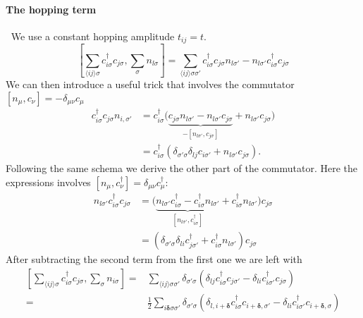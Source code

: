 \documentclass[../main.tex]{subfile}
\begin{document}
\paragraph{The hopping term} $~$ We use a constant hopping amplitude $t_{ij} = t$.
\[
    \left[ \sum_{\langle ij\rangle\sigma} c_{i\sigma}^{\dagger}c_{j\sigma} , \sum_{\sigma} n_{l\sigma}\right] 
    = \sum_{\langle ij\rangle\sigma\sigma'}  c_{i\sigma}^{\dagger}c_{j\sigma}n_{l\sigma'} - n_{l\sigma'}c_{i\sigma}^{\dagger}c_{j\sigma}
\]
We can then introduce a useful trick that involves the commutator $[n_{\mu},c_{\nu}] = -\delta_{\mu\nu}c_{\mu}$
\begin{equation*}
    \begin{aligned}
    c_{i\sigma}^{\dagger}c_{j\sigma}n_{i,\sigma'} &= c_{i\sigma}^{\dagger} \bigl( \underbrace{c_{j\sigma}n_{l\sigma'} 
    -n_{l\sigma'}c_{j\sigma}}_{-[n_{l\sigma'},c_{j\sigma}]} + n_{l\sigma'}c_{j\sigma}\bigr) \\
    & = c_{i\sigma}^{\dagger} \left(\delta_{\sigma'\sigma}\delta_{lj}c_{i\sigma'} + n_{l\sigma'}c_{j\sigma}\right).
    \end{aligned}
\end{equation*}
Following the same schema we derive the other part of the commutator. Here the expressions involves
$[n_{\mu}, c^{\dagger}_{\nu}] = \delta_{\mu\nu}c^{\dagger}_{\mu}$:
\begin{equation*}
    \begin{aligned}
        n_{l\sigma'}c_{i\sigma}^{\dagger}c_{j\sigma} &= \bigl( \underbrace{n_{l\sigma'}c_{i\sigma}^{\dagger} 
        - c_{i\sigma}^{\dagger}n_{l\sigma'}}_{[n_{l\sigma'}, c^{\dagger}_{i\sigma}]} + c_{i\sigma}^{\dagger}n_{l\sigma'} \bigr)c_{j\sigma} \\
        &= \left(\delta_{\sigma'\sigma}\delta_{li}c_{j\sigma'}^{\dagger} + c_{i\sigma}^{\dagger}n_{l\sigma'} \right)c_{j\sigma}
    \end{aligned}
\end{equation*}
After subtracting the second term from the first one we are left with
\begin{equation*}
    \begin{aligned}
    \left[ \sum_{\langle ij\rangle\sigma} c_{i\sigma}^{\dagger}c_{j\sigma} , \sum_{\sigma} n_{i\sigma}\right] 
    =&\sum_{\langle ij\rangle\sigma\sigma'} \delta_{\sigma'\sigma} \left( \delta_{lj}c_{i\sigma}^{\dagger} c_{j\sigma'} - \delta_{li}c_{i\sigma'}^{\dagger}c_{j\sigma}\right)\\
    =& \frac{1}{2}\sum_{ i \bm{\delta}\sigma\sigma'} \delta_{\sigma'\sigma} \left( \delta_{l,i+ \bm{\delta}}c_{i\sigma}^{\dagger} c_{i+ \bm{\delta},\sigma'} - \delta_{li}c_{i\sigma'}^{\dagger}c_{i+ \bm{\delta},\sigma}\right)
\end{aligned}
\end{equation*}
\end{document}
